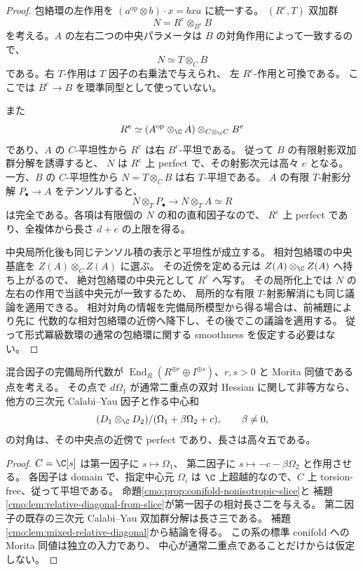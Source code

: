 \begin{proof}
包絡環の左作用を
$(a^{\mathrm{op}}\otimes b)\cdot x=bxa$ に統一する。
$(R^e,T)$ 双加群
\[
 N=R^e\otimes_{B^e}B
\]
を考える。$A$ の左右二つの中央パラメータは $B$ の対角作用によって一致するので、
\[
 N\simeq T\otimes_C B
\]
である。右 $T$-作用は $T$ 因子の右乗法で与えられ、
左 $R^e$-作用と可換である。
ここでは $B^e\to B$ を環準同型として使っていない。

また
\[
 R^e\simeq(A^{\mathrm{op}}\otimes_\C A)
                 \otimes_{C\otimes_\C C}B^e
\]
であり、$A$ の $C$-平坦性から $R^e$ は右 $B^e$-平坦である。
従って $B$ の有限射影双加群分解を誘導すると、
$N$ は $R^e$ 上 perfect で、その射影次元は高々 $e$ となる。
一方、$B$ の $C$-平坦性から $N=T\otimes_C B$ は右 $T$-平坦である。
$A$ の有限 $T$-射影分解 $P_\bullet\to A$ をテンソルすると、
\[
 N\otimes_TP_\bullet\longrightarrow
 N\otimes_TA\simeq R
\]
は完全である。各項は有限個の $N$ の和の直和因子なので、
$R^e$ 上 perfect であり、全複体から長さ $d+e$ の上限を得る。

中央局所化後も同じテンソル積の表示と平坦性が成立する。
相対包絡環の中央基底を $Z(A)\otimes_C Z(A)$ に選ぶ。
その近傍を定める元は $Z(A)\otimes_\C Z(A)$ へ持ち上がるので、
絶対包絡環の中央元として $R^e$ へ写す。
その局所化上では $N$ の左右の作用で当該中央元が一致するため、
局所的な有限 $T$-射影解消にも同じ議論を適用できる。
相対対角の情報を完備局所模型から得る場合は、前補題により先に
代数的な相対包絡環の近傍へ降下し、その後でこの議論を適用する。
従って形式冪級数環の通常の包絡環に関する smoothness を仮定する必要はない。
\end{proof}

\begin{corollary}[節点を含む混合中心和への適用]
\label{cmo:cor:node-mixed-smooth}
混合因子の完備局所代数が
$\operatorname{End}_R(R^{\oplus r}\oplus I^{\oplus s})$、$r,s>0$ と Morita 同値である点を考える。
その点で $d\Omega_1$ が通常二重点の双対 Hessian に関して非等方なら、
他方の三次元 Calabi--Yau 因子と作る中心和
\[
 (D_1\otimes_\C D_2)/(\Omega_1+\beta\Omega_2+c),\qquad \beta\ne0,
\]
の対角は、その中央点の近傍で perfect であり、長さは高々五である。
\end{corollary}
\begin{proof}
$C=\C[s]$ は第一因子に $s\mapsto\Omega_1$、
第二因子に $s\mapsto-c-\beta\Omega_2$ と作用させる。
各因子は domain で、指定中心元 $\Omega_i$ は $\C$ 上超越的なので、$C$ 上 torsion-free、従って平坦である。
命題\ref{cmo:prop:conifold-nonisotropic-slice}と
補題\ref{cmo:lem:relative-diagonal-from-slice}が第一因子の相対長さ二を与える。
第二因子の既存の三次元 Calabi--Yau 双加群分解は長さ三である。
補題\ref{cmo:lem:mixed-relative-diagonal}から結論を得る。
この系の標準 conifold への Morita 同値は独立の入力であり、
中心が通常二重点であることだけからは仮定しない。
\end{proof}

